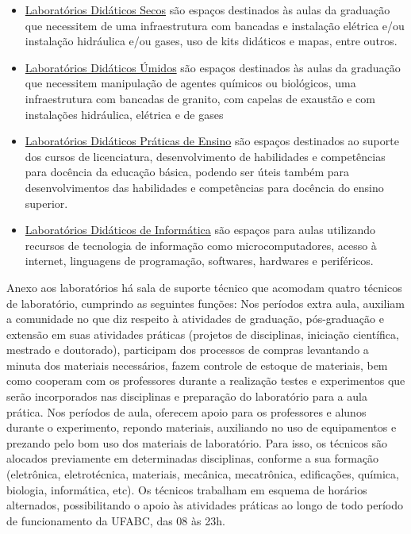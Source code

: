 \documentclass{article}
\begin{document}
\begin{itemize}
	\item \underline{Laboratórios Didáticos Secos} são espaços destinados às aulas da graduação que necessitem de uma infraestrutura com bancadas e instalação elétrica e/ou instalação hidráulica e/ou gases, uso de kits didáticos e mapas, entre outros.
	\item \underline{Laboratórios Didáticos Úmidos} são espaços destinados às aulas da graduação que necessitem manipulação de agentes químicos ou biológicos, uma infraestrutura com bancadas de granito, com capelas de exaustão e com instalações hidráulica, elétrica e de gases
	\item \underline{Laboratórios Didáticos Práticas de Ensino} são espaços destinados ao suporte dos cursos de licenciatura, desenvolvimento de habilidades e competências para docência da educação básica, podendo ser úteis também para desenvolvimentos das habilidades e competências para docência do ensino superior.
	\item \underline{Laboratórios Didáticos de Informática} são espaços para aulas utilizando recursos de tecnologia de informação como microcomputadores, acesso à internet, linguagens de programação, softwares, hardwares e periféricos.
\end{itemize}

Anexo aos laboratórios há sala de suporte técnico que acomodam quatro técnicos de laboratório, cumprindo as seguintes funções: Nos períodos extra aula, auxiliam a comunidade no que diz respeito à atividades de graduação, pós-graduação e extensão em suas atividades práticas (projetos de disciplinas, iniciação científica, mestrado e doutorado), participam dos processos de compras levantando a minuta dos materiais necessários, fazem controle de estoque de materiais, bem como cooperam com os professores durante a realização testes e experimentos que serão incorporados nas disciplinas e preparação do laboratório para a aula prática. Nos períodos de aula, oferecem apoio para os professores e alunos durante o experimento, repondo materiais, auxiliando no uso de equipamentos e prezando pelo bom uso dos materiais de laboratório. Para isso, os técnicos são alocados previamente em determinadas disciplinas, conforme a sua formação (eletrônica, eletrotécnica, materiais, mecânica, mecatrônica, edificações, química, biologia, informática, etc). Os técnicos trabalham em esquema de horários alternados, possibilitando o apoio às atividades práticas ao longo de todo período de funcionamento da UFABC, das 08 às 23h.
\end{document}
